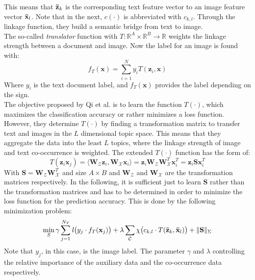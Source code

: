 This means that $\mathbf{\bar{z}}_k$ is the corresponding text feature vector to an image feature vector $\mathbf{\bar{x}}_l$.
Note that in the next, $c(\cdot)$ is abbreviated with $c_{k,l}$.
Through the linkage function, they build a semantic bridge from text to image.\cite{Qi.2011}\\
The so-called \textit{translator} function with $T : \mathbb{R}^A \times \mathbb{R}^B \to \mathbb{R}$ weights the linkage strength between a document and image.
Now the label for an image is found with:\cite{Qi.2011}
\begin{equation}
	f_T (\mathbf{x}) = \sum_{i=1}^{N} y_i T(\mathbf{z}_i,\mathbf{x})
\end{equation}
Where $y_i$ is the text document label, and $f_T (\mathbf{x})$ provides the label depending on the sign.\\
The objective proposed by Qi et al. is to learn the function $T(\cdot)$, which maximizes the classification accuracy or rather minimizes a loss function. However, they determine $T(\cdot)$ by finding a transformation matrix to transfer text and images in the $L$ dimensional topic space. This means that they aggregate the data into the least $L$ topics, where the linkage strength of image and text co-occurrence is weighted. The extended $T(\cdot)$ function has the form of:\cite{Qi.2011}
\begin{equation}
T(\mathbf{z}_i\mathbf{x}_j) = \langle \mathbf{W}_\mathcal{Z}\mathbf{z}_i,\mathbf{W}_\mathcal{X}\mathbf{x}_i\rangle = \mathbf{z}_i \mathbf{W}_\mathcal{Z}\mathbf{W}_\mathcal{X}^T\mathbf{x}_i^T = \mathbf{z}_i\mathbf{S}\mathbf{x}_i^T 
\end{equation}
With $\mathbf{S} = \mathbf{W}_\mathcal{Z}\mathbf{W}_\mathcal{X}^T$ and size $A \times B$ and $\mathbf{W}_\mathcal{Z}$ and $\mathbf{W}_\mathcal{X}$ are the transformation matrices respectively.
In the following, it is sufficient just to learn $\mathbf{S}$ rather than the transformation matrices and has to be determined in order to minimize the loss function for the prediction accuracy. This is done by the following minimization problem:\cite{Qi.2011}
\begin{equation}\label{EqTTIGeneralOpt}
\min_{S} \gamma \sum_{j=1}^{N_T}\mathit{l}\big( y_j \cdot f_T(\mathbf{x}_j) \big) + \lambda \sum_{\mathcal{C}}  \chi \big( c_{k,l} \cdot T(\mathbf{\bar{z}}_k,\mathbf{\bar{x}}_l)\big) + \Vert \mathbf{S}\Vert_\Sigma
\end{equation}
Note that $y_j$, in this case, is the image label.
The parameter $\gamma$ and $\lambda$ controlling the relative importance of the auxiliary data and the co-occurrence data respectively.
